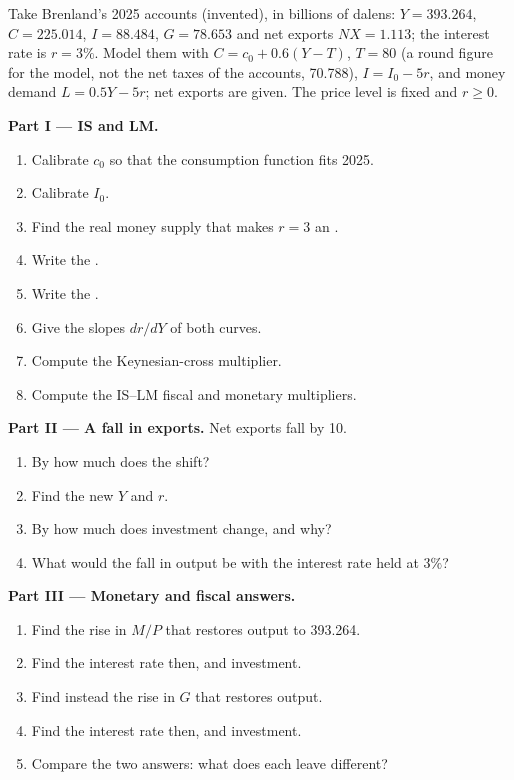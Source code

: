 \begin{problem}\label{pb:b1:is-lm:brenland}
Take Brenland's 2025 accounts (invented), in billions of dalens: $Y = 393.264$,
$C = 225.014$, $I = 88.484$, $G = 78.653$ and net exports $NX = 1.113$; the interest rate is
$r = 3\%$. Model them with $C = c_0 + 0.6(Y - T)$, $T = 80$ (a round figure for
the model, not the net taxes of the accounts, 70.788), $I = I_0 - 5r$, and money demand
$L = 0.5Y - 5r$; net exports are given. The price level is fixed and $r \ge 0$.

\medskip\noindent\textbf{Part I --- IS and LM.}
\begin{enumerate}
  \item Calibrate $c_0$ so that the consumption function fits 2025.
  \item Calibrate $I_0$.
  \item Find the real money supply that makes $r = 3$ an .
  \item Write the .
  \item Write the .
  \item Give the slopes $dr/dY$ of both curves.
  \item Compute the Keynesian-cross multiplier.
  \item Compute the IS--LM fiscal and monetary multipliers.
\end{enumerate}

\medskip\noindent\textbf{Part II --- A fall in exports.} Net exports fall by 10.
\begin{enumerate}[resume]
  \item By how much does the  shift?
  \item Find the new $Y$ and $r$.
  \item By how much does investment change, and why?
  \item What would the fall in output be with the interest rate held at $3\%$?
\end{enumerate}

\medskip\noindent\textbf{Part III --- Monetary and fiscal answers.}
\begin{enumerate}[resume]
  \item Find the rise in $M/P$ that restores output to 393.264.
  \item Find the interest rate then, and investment.
  \item Find instead the rise in $G$ that restores output.
  \item Find the interest rate then, and investment.
  \item Compare the two answers: what does each leave different?
\end{enumerate}


\end{problem}
